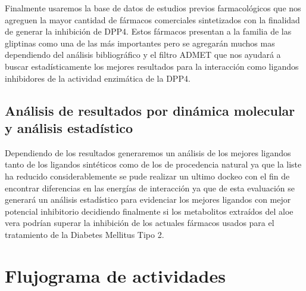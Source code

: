 Finalmente usaremos la base de datos de estudios previos farmacológicos que nos agreguen la mayor cantidad de fármacos comerciales sintetizados con la finalidad de generar la inhibición de DPP4. Estos fármacos presentan a la familia de las gliptinas como una de las más importantes pero se agregarán muchos mas dependiendo del análisis bibliográfico y el filtro ADMET que nos ayudará a buscar estadísticamente los mejores resultados para la interacción como ligandos inhibidores de la actividad enzimática de la DPP4. 

\subsection{Análisis de resultados por dinámica molecular y análisis estadístico}
Dependiendo de los resultados generaremos un análisis de los mejores ligandos tanto de los ligandos sintéticos como de los de procedencia natural ya que la liste ha reducido considerablemente se pude realizar un ultimo dockeo con el fin de encontrar diferencias en las energías de interacción ya que de esta evaluación se generará un análisis estadístico para evidenciar los mejores ligandos con mejor potencial inhibitorio decidiendo finalmente si los metabolitos extraídos del aloe vera podrían superar la inhibición de los actuales fármacos usados para el tratamiento de la Diabetes Mellitus Tipo 2.
\newpage
\section{Flujograma de actividades}

